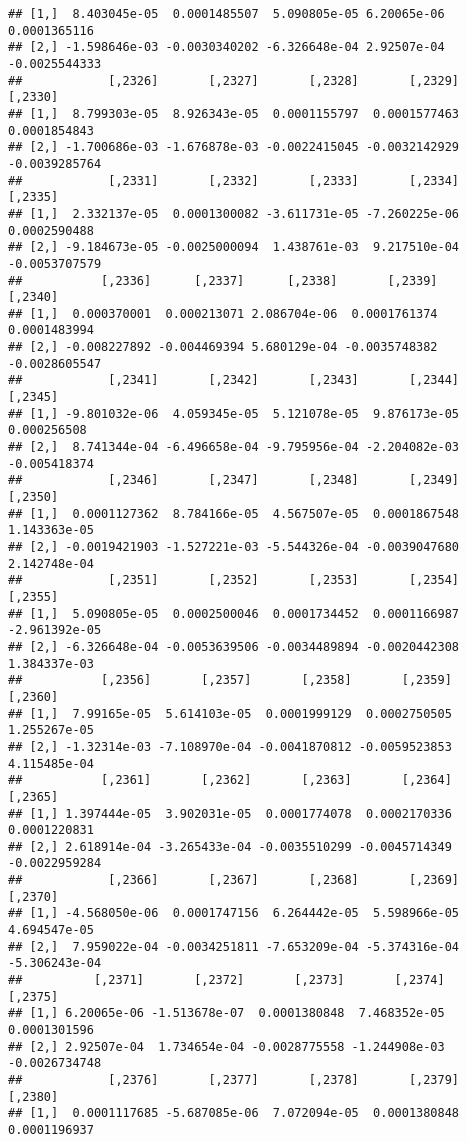 \documentclass[
]{article}
\begin{document}
\begin{verbatim}
## [1,]  8.403045e-05  0.0001485507  5.090805e-05 6.20065e-06  0.0001365116
## [2,] -1.598646e-03 -0.0030340202 -6.326648e-04 2.92507e-04 -0.0025544333
##            [,2326]       [,2327]       [,2328]       [,2329]       [,2330]
## [1,]  8.799303e-05  8.926343e-05  0.0001155797  0.0001577463  0.0001854843
## [2,] -1.700686e-03 -1.676878e-03 -0.0022415045 -0.0032142929 -0.0039285764
##            [,2331]       [,2332]       [,2333]       [,2334]       [,2335]
## [1,]  2.332137e-05  0.0001300082 -3.611731e-05 -7.260225e-06  0.0002590488
## [2,] -9.184673e-05 -0.0025000094  1.438761e-03  9.217510e-04 -0.0053707579
##           [,2336]      [,2337]      [,2338]       [,2339]       [,2340]
## [1,]  0.000370001  0.000213071 2.086704e-06  0.0001761374  0.0001483994
## [2,] -0.008227892 -0.004469394 5.680129e-04 -0.0035748382 -0.0028605547
##            [,2341]       [,2342]       [,2343]       [,2344]      [,2345]
## [1,] -9.801032e-06  4.059345e-05  5.121078e-05  9.876173e-05  0.000256508
## [2,]  8.741344e-04 -6.496658e-04 -9.795956e-04 -2.204082e-03 -0.005418374
##            [,2346]       [,2347]       [,2348]       [,2349]      [,2350]
## [1,]  0.0001127362  8.784166e-05  4.567507e-05  0.0001867548 1.143363e-05
## [2,] -0.0019421903 -1.527221e-03 -5.544326e-04 -0.0039047680 2.142748e-04
##            [,2351]       [,2352]       [,2353]       [,2354]       [,2355]
## [1,]  5.090805e-05  0.0002500046  0.0001734452  0.0001166987 -2.961392e-05
## [2,] -6.326648e-04 -0.0053639506 -0.0034489894 -0.0020442308  1.384337e-03
##           [,2356]       [,2357]       [,2358]       [,2359]      [,2360]
## [1,]  7.99165e-05  5.614103e-05  0.0001999129  0.0002750505 1.255267e-05
## [2,] -1.32314e-03 -7.108970e-04 -0.0041870812 -0.0059523853 4.115485e-04
##           [,2361]       [,2362]       [,2363]       [,2364]       [,2365]
## [1,] 1.397444e-05  3.902031e-05  0.0001774078  0.0002170336  0.0001220831
## [2,] 2.618914e-04 -3.265433e-04 -0.0035510299 -0.0045714349 -0.0022959284
##            [,2366]       [,2367]       [,2368]       [,2369]       [,2370]
## [1,] -4.568050e-06  0.0001747156  6.264442e-05  5.598966e-05  4.694547e-05
## [2,]  7.959022e-04 -0.0034251811 -7.653209e-04 -5.374316e-04 -5.306243e-04
##          [,2371]       [,2372]       [,2373]       [,2374]       [,2375]
## [1,] 6.20065e-06 -1.513678e-07  0.0001380848  7.468352e-05  0.0001301596
## [2,] 2.92507e-04  1.734654e-04 -0.0028775558 -1.244908e-03 -0.0026734748
##            [,2376]       [,2377]       [,2378]       [,2379]       [,2380]
## [1,]  0.0001117685 -5.687085e-06  7.072094e-05  0.0001380848  0.0001196937

\end{verbatim}
\end{document}
